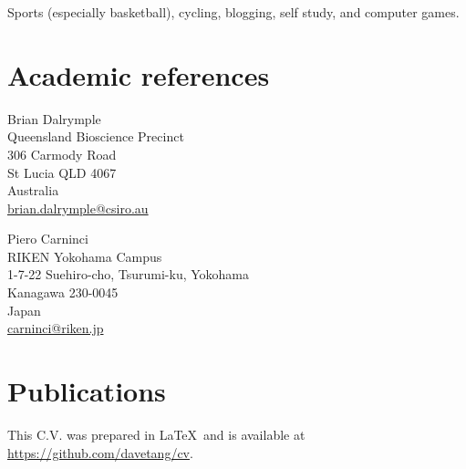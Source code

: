 \documentclass[a4paper, 11pt]{article}
\begin{document}
Sports (especially basketball), cycling, blogging, self study, and computer games.

\section*{Academic references}

\begin{minipage}[ht]{.50\textwidth}
Brian Dalrymple \\
Queensland Bioscience Precinct \\
306 Carmody Road \\
St Lucia QLD 4067 \\
Australia \\
\href{mailto:brian.dalrymple@csiro.au}{brian.dalrymple@csiro.au}
\end{minipage}
\begin{minipage}[ht]{.50\textwidth}
Piero Carninci \\
RIKEN Yokohama Campus \\
1-7-22 Suehiro-cho, Tsurumi-ku, Yokohama \\
Kanagawa 230-0045 \\
Japan \\
\href{mailto:carninci@riken.jp}{carninci@riken.jp}
\end{minipage}

\section*{Publications}
\begingroup
   \renewcommand{\section}[2]{}%
   
   \nocite{*}
   
\endgroup

\vfill

\footnotesize
This C.V. was prepared in \LaTeX\ and is available at \href{https://github.com/davetang/cv}{https://github.com/davetang/cv}.
\end{document}
